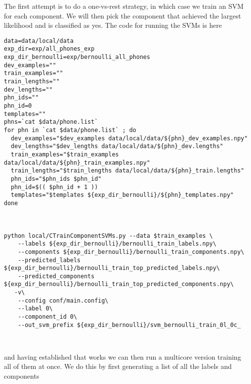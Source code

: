 \documentclass{article}
\begin{document}
The first attempt is to do a one-vs-rest strategy, in which case
we train an SVM for each component.  We will then pick the component that
achieved the largest likelihood and is classified as yes.
The code for running the SVMs is here
\begin{verbatim}
data=data/local/data
exp_dir=exp/all_phones_exp
exp_dir_bernoulli=exp/bernoulli_all_phones
dev_examples=""
train_examples=""
train_lengths=""
dev_lengths=""
phn_ids=""
phn_id=0
templates=""
phns=`cat $data/phone.list`
for phn in `cat $data/phone.list` ; do
  dev_examples="$dev_examples data/local/data/${phn}_dev_examples.npy"
  dev_lengths="$dev_lengths data/local/data/${phn}_dev.lengths"
  train_examples="$train_examples data/local/data/${phn}_train_examples.npy"
  train_lengths="$train_lengths data/local/data/${phn}_train.lengths"
  phn_ids="$phn_ids $phn_id"
  phn_id=$(( $phn_id + 1 ))
  templates="$templates ${exp_dir_bernoulli}/${phn}_templates.npy"
done



python local/CTrainComponentSVMs.py --data $train_examples \
    --labels ${exp_dir_bernoulli}/bernoulli_train_labels.npy\
    --components ${exp_dir_bernoulli}/bernoulli_train_components.npy\
    --predicted_labels ${exp_dir_bernoulli}/bernoulli_train_top_predicted_labels.npy\
    --predicted_components ${exp_dir_bernoulli}/bernoulli_train_top_predicted_components.npy\
   -v\
    --config conf/main.config\
    --label 0\
    --component_id 0\
    --out_svm_prefix ${exp_dir_bernoulli}/svm_bernoulli_train_0l_0c_



\end{verbatim}
and having established that works we can then run a multicore version
training all of them at once. We do this by first generating a list
of all the labels and components
\end{document}
